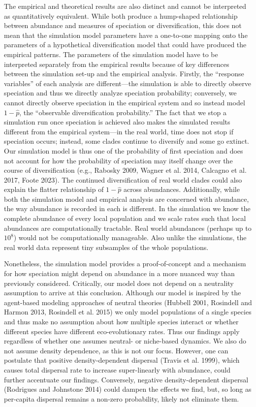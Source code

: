 \documentclass[
  letterpaper,
  DIV=11,
  numbers=noendperiod]{scrartcl}
\begin{document}
The empirical and theoretical results are also distinct and cannot be
interpreted as quantitatively equivalent. While both produce a
hump-shaped relationship between abundance and measures of speciation or
diversification, this does not mean that the simulation model parameters
have a one-to-one mapping onto the parameters of a hypothetical
diversification model that could have produced the empirical patterns.
The parameters of the simulation model have to be interpreted separately
from the empirical results because of key differences between the
simulation set-up and the empirical analysis. Firstly, the ``response
variables'' of each analysis are different---the simulation is able to
directly observe speciation and thus we directly analyze speciation
probability; conversely, we cannot directly observe speciation in the
empirical system and so instead model \(1 - \hat{p}\), the ``observable
diversification probability.'' The fact that we stop a simulation run
once speciation is achieved also makes the simulated results different
from the empirical system---in the real world, time does not stop if
speciation occurs; instead, some clades continue to diversify and some
go extinct. Our simulation model is thus one of the probability of first
speciation and does not account for how the probability of speciation
may itself change over the course of diversification (e.g., Rabosky
2009, Wagner et al. 2014, Calcagno et al. 2017, Foote 2023). The
continued diversification of real world clades could also explain the
flatter relationship of \(1 - \hat{p}\) across abundances. Additionally,
while both the simulation model and empirical analysis are concerned
with abundance, the way abundance is recorded in each is different. In
the simulation we know the complete abundance of every local population
and we scale rates such that local abundances are computationally
tractable. Real world abundances (perhaps up to \(10^8\)) would not be
computationally manageable. Also unlike the simulations, the real world
data represent tiny subsamples of the whole populations.

Nonetheless, the simulation model provides a proof-of-concept and a
mechanism for how speciation might depend on abundance in a more nuanced
way than previously considered. Critically, our model does not depend on
a neutrality assumption to arrive at this conclusion. Although our model
is inspired by the agent-based modeling approaches of neutral theories
(Hubbell 2001, Rosindell and Harmon 2013, Rosindell et al. 2015) we only
model populations of a single species and thus make no assumption about
how multiple species interact or whether different species have
different eco-evolutionary rates. Thus our findings apply regardless of
whether one assumes neutral- or niche-based dynamics. We also do not
assume density dependence, as this is not our focus. However, one can
postulate that positive density-dependent dispersal (Travis et al.
1999), which causes total dispersal rate to increase super-linearly with
abundance, could further accentuate our findings. Conversely, negative
density-dependent dispersal (Rodrigues and Johnstone 2014) could dampen
the effects we find, but, so long as per-capita dispersal remains a
non-zero probability, likely not eliminate them.
\end{document}

